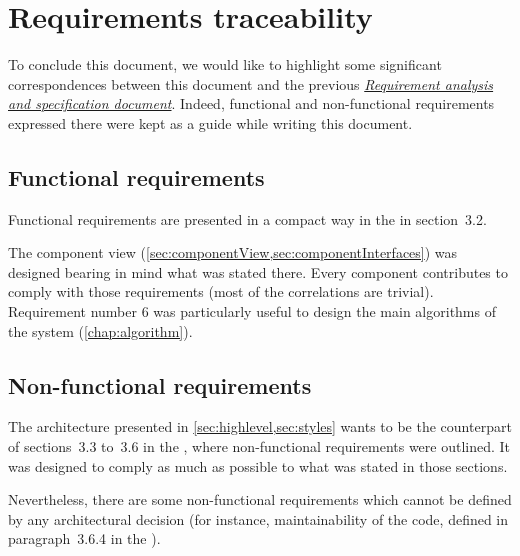 \chapter{Requirements traceability} \label{chap:traceability}
To conclude this document, we would like to highlight some significant correspondences between this document and the previous \hyperlink{subsec:references}{\emph{Requirement analysis and specification document}}. Indeed, functional and non-functional requirements expressed there were kept as a guide while writing this document.

\section{Functional requirements}
Functional requirements are presented in a compact way in the \rasd in section~3.2. 

The component view (\cref{sec:componentView,sec:componentInterfaces}) was designed bearing in mind what was stated there. Every component contributes to comply with those requirements (most of the correlations are trivial). Requirement number 6 was particularly useful to design the main algorithms of the system (\cref{chap:algorithm}).

\section{Non-functional requirements}
The architecture presented in \cref{sec:highlevel,sec:styles} wants to be the counterpart of sections~3.3 to~3.6 in the \rasd, where non-functional requirements were outlined. It was designed to comply as much as possible to what was stated in those sections.

Nevertheless, there are some non-functional requirements which cannot be defined by any architectural decision (for instance, maintainability of the code, defined in paragraph~3.6.4 in the \rasd).